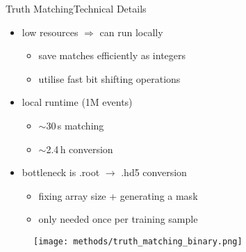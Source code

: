 \documentclass[9pt, aspectratio=169]{beamer}
\begin{document}
\begin{frame}{Truth Matching}{Technical Details}
	\begin{minipage}{.69\textwidth}
		\begin{itemize}
			\item low resources $\Rightarrow$ can run locally
			\begin{itemize}
				\item save matches efficiently as integers 
				\item utilise fast bit shifting operations
			\end{itemize}
			\item local runtime (1M events) 
			\begin{itemize}
				\item $\sim$30\,s matching
				\item $\sim$2.4\,h conversion
			\end{itemize}
			\item bottleneck is .root $\rightarrow$ .hd5 conversion
			\begin{itemize}
				\item fixing array size + generating a mask
				\item only needed once per training sample
			\end{itemize}
		\end{itemize}
	\end{minipage}\hfill
	\begin{minipage}{.3\textwidth}
		\begin{figure}
			\centering
			\texttt{[image: methods/truth\_matching\_binary.png]}
		\end{figure}
	\end{minipage}
\end{frame}

\end{document}
